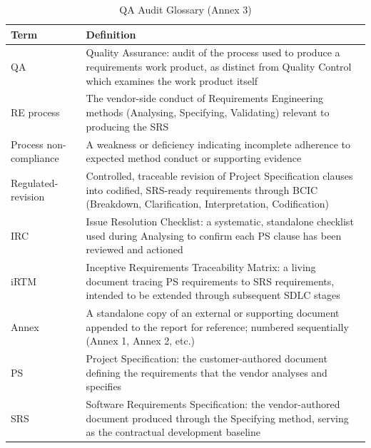 \documentclass[11pt,a4paper]{article}
\begin{document}
\begin{table}[H]
\centering
\small
\renewcommand{\arraystretch}{1.4}
\begin{tabularx}{\textwidth}{|p{}|X|}
\hline
\rowcolor{tableheader}
\textbf{Term} & \textbf{Definition} \\
\hline
QA & Quality Assurance: audit of the process used to produce a requirements work product, as distinct from Quality Control which examines the work product itself \\
\hline
RE process & The vendor-side conduct of Requirements Engineering methods (Analysing, Specifying, Validating) relevant to producing the SRS \\
\hline
Process non-compliance & A weakness or deficiency indicating incomplete adherence to expected method conduct or supporting evidence \\
\hline
Regulated-revision & Controlled, traceable revision of Project Specification clauses into codified, SRS-ready requirements through BCIC (Breakdown, Clarification, Interpretation, Codification) \\
\hline
IRC & Issue Resolution Checklist: a systematic, standalone checklist used during Analysing to confirm each PS clause has been reviewed and actioned \\
\hline
iRTM & Inceptive Requirements Traceability Matrix: a living document tracing PS requirements to SRS requirements, intended to be extended through subsequent SDLC stages \\
\hline
Annex & A standalone copy of an external or supporting document appended to the report for reference; numbered sequentially (Annex 1, Annex 2, etc.) \\
\hline
PS & Project Specification: the customer-authored document defining the requirements that the vendor analyses and specifies \\
\hline
SRS & Software Requirements Specification: the vendor-authored document produced through the Specifying method, serving as the contractual development baseline \\
\hline
\end{tabularx}
\caption{QA Audit Glossary (Annex 3)}
\label{tab:qa-glossary}
\end{table}

\clearpage
{}
\setcounter{page}{1}
\renewcommand{\thepage}{R-\arabic{page}}
\end{document}
